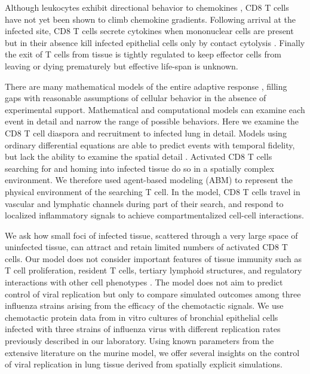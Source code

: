 \documentclass[10pt]{article}
\begin{document}
Although leukocytes exhibit directional behavior to chemokines \cite{LiJeon2002, McDonald2010}, CD8 T cells have not yet been shown to climb chemokine gradients.   Following arrival at the infected site, CD8 T cells secrete cytokines when mononuclear cells are present but in their absence kill infected epithelial cells only by contact cytolysis \cite{Hufford2011}.   Finally the exit of T cells from tissue is tightly regulated to keep effector cells from leaving or dying prematurely \cite{Jennrich2012, Richter2007} but effective life-span is unknown. 

There are many mathematical models of the entire adaptive response \cite{Miao2010, Saenz2010, Beltman2007, Handel2008, Zheng2008, Lee2009}, filling gaps with reasonable assumptions of cellular behavior in the absence of experimental support.  Mathematical and computational models can examine each event in detail and narrow the range of possible behaviors.  Here we examine the CD8 T cell diaspora and recruitment to infected lung in detail.  Models using ordinary differential equations are able to predict events with temporal fidelity, but lack the ability to examine the spatial detail \cite{Beauchemin2006a, Bauer2009}.   Activated CD8 T cells searching for and homing into infected tissue do so in a spatially complex environment.  We therefore used agent-based modeling (ABM) to represent the physical environment of the searching T cell.  In the model, CD8 T cells travel in vascular and lymphatic channels during part of their search, and respond to localized inflammatory signals to achieve compartmentalized cell-cell interactions.  

We ask how small foci of infected tissue, scattered through a very large space of uninfected tissue, can attract and retain limited numbers of activated CD8 T cells.  Our model does not consider important features of tissue immunity such as T cell proliferation, resident T cells, tertiary lymphoid structures, and regulatory interactions with other cell phenotypes \cite{McGill2009}.  The model does not aim to predict control of viral replication but only to compare simulated outcomes among three influenza strains arising from the efficacy of the chemotactic signals.  We use chemotactic protein data from in vitro cultures of bronchial epithelial cells infected with three strains of influenza virus with different replication rates \cite{Mitchell2011} previously described in our laboratory.  Using known parameters from the extensive literature on the murine model, we offer several insights on the control of viral replication in lung tissue derived from spatially explicit simulations.  
\end{document}
